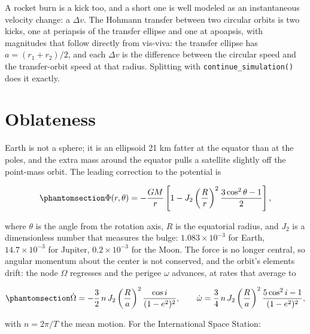\documentclass[
  10.5pt,
  letterpaper,
]{scrbook}
\theoremstyle{plain}
\theoremstyle{remark}
\begin{document}
A rocket burn is a kick too, and a short one is well modeled as an
instantaneous velocity change: a \(\Delta v\). The Hohmann transfer
between two circular orbits is two kicks, one at periapsis of the
transfer ellipse and one at apoapsis, with magnitudes that follow
directly from vis-viva: the transfer ellipse has \(a = (r_1 + r_2)/2\),
and each \(\Delta v\) is the difference between the circular speed and
the transfer-orbit speed at that radius. Splitting with
\texttt{continue\_simulation()} does it exactly.

\section{Oblateness}\label{oblateness}

Earth is not a sphere; it is an ellipsoid 21 km fatter at the equator
than at the poles, and the extra mass around the equator pulls a
satellite slightly off the point-mass orbit. The leading correction to
the potential is

\begin{equation}\protect\phantomsection\label{eq-j2}{
\Phi(r,\theta) = -\frac{GM}{r}\left[1 - J_2\left(\frac{R}{r}\right)^2\frac{3\cos^2\theta - 1}{2}\right],
}\end{equation}

where \(\theta\) is the angle from the rotation axis, \(R\) is the
equatorial radius, and \(J_2\) is a dimensionless number that measures
the bulge: \(1.083\times10^{-3}\) for Earth, \(14.7\times10^{-3}\) for
Jupiter, \(0.2\times10^{-3}\) for the Moon. The force is no longer
central, so angular momentum about the center is not conserved, and the
orbit's elements drift: the node \(\Omega\) regresses and the perigee
\(\omega\) advances, at rates that average to

\begin{equation}\protect\phantomsection\label{eq-j2-rates}{
\dot\Omega = -\frac{3}{2}\,n\,J_2\left(\frac{R}{a}\right)^2\frac{\cos i}{(1-e^2)^2}, \qquad
\dot\omega = \frac{3}{4}\,n\,J_2\left(\frac{R}{a}\right)^2\frac{5\cos^2 i - 1}{(1-e^2)^2},
}\end{equation}

with \(n = 2\pi/T\) the mean motion. For the International Space
Station:
\end{document}
